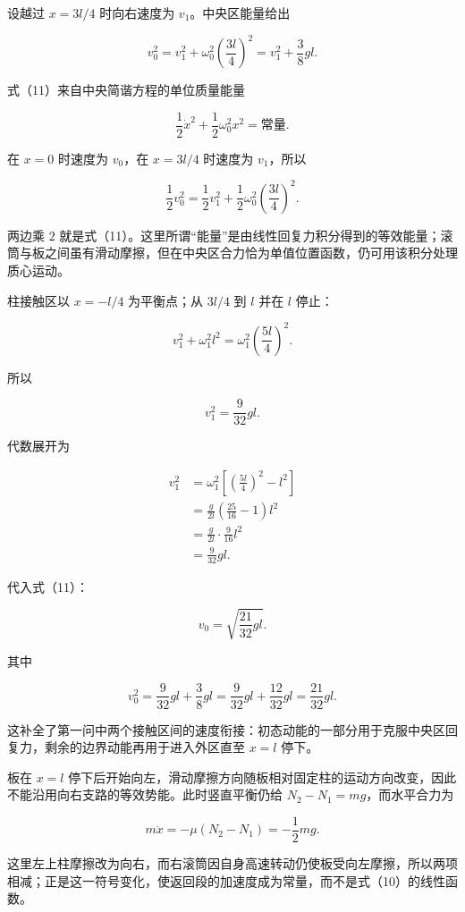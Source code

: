 \documentclass[12pt,a4paper,UTF8]{ctexart}
\begin{document}
设越过 \(x=3l/4\) 时向右速度为 \(v_1\)。中央区能量给出

\[
v_0^2=v_1^2+\omega_0^2\left(\frac{3l}{4}\right)^2
=v_1^2+\frac38gl.
\tag{11}
\]

式（11）来自中央简谐方程的单位质量能量

\[
\frac12\dot x^2+\frac12\omega_0^2x^2=\text{常量}.
\]

在 \(x=0\) 时速度为 \(v_0\)，在 \(x=3l/4\) 时速度为 \(v_1\)，所以

\[
\frac12v_0^2
=\frac12v_1^2
+\frac12\omega_0^2\left(\frac{3l}{4}\right)^2.
\]

两边乘 \(2\)
就是式（11）。这里所谓``能量''是由线性回复力积分得到的等效能量；滚筒与板之间虽有滑动摩擦，但在中央区合力恰为单值位置函数，仍可用该积分处理质心运动。

柱接触区以 \(x=-l/4\) 为平衡点；从 \(3l/4\) 到 \(l\) 并在 \(l\) 停止：

\[
v_1^2+\omega_1^2l^2
=\omega_1^2\left(\frac{5l}{4}\right)^2.
\tag{12}
\]

所以

\[
v_1^2=\frac{9}{32}gl.
\tag{13}
\]

代数展开为

\[
\begin{aligned}
v_1^2
&=\omega_1^2
\left[\left(\frac{5l}{4}\right)^2-l^2\right]\\
&=\frac g{2l}\left(\frac{25}{16}-1\right)l^2\\
&=\frac g{2l}\cdot\frac9{16}l^2\\
&=\frac9{32}gl.
\end{aligned}
\]

代入式（11）：

\[
\boxed{
v_0=\sqrt{\frac{21}{32}gl}
}.
\tag{14}
\]

其中

\[
v_0^2
=\frac9{32}gl+\frac38gl
=\frac9{32}gl+\frac{12}{32}gl
=\frac{21}{32}gl.
\]

这补全了第一问中两个接触区间的速度衔接：初态动能的一部分用于克服中央区回复力，剩余的边界动能再用于进入外区直至
\(x=l\) 停下。

板在 \(x=l\)
停下后开始向左，滑动摩擦方向随板相对固定柱的运动方向改变，因此不能沿用向右支路的等效势能。此时竖直平衡仍给
\(N_2-N_1=mg\)，而水平合力为

\[
m\ddot x=-\mu(N_2-N_1)=-\frac12mg.
\tag{15}
\]

这里左上柱摩擦改为向右，而右滚筒因自身高速转动仍使板受向左摩擦，所以两项相减；正是这一符号变化，使返回段的加速度成为常量，而不是式（10）的线性函数。
\end{document}
